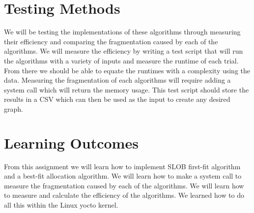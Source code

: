 \documentclass[letterpaper,10pt]{article}
\begin{document}
\section{Testing Methods}
We will be testing the implementations of these algorithms through measuring their efficiency and 
comparing the fragmentation caused by each of the algorithms. We will measure the efficiency by 
writing a test script that will run the algorithms with a variety of inputs and measure the runtime 
of each trial. From there we should be able to equate the runtimes with a complexity using the data.
 Measuring the fragmentation of each algorithms will require adding a system call which will return 
 the memory usage. This test script should store the results in a CSV which can then be used as the 
 input to create any desired graph.

\section{Learning Outcomes}
From this assignment we will learn how to implement SLOB first-fit algorithm and a best-fit 
allocation algorithm. We will learn how to make a system call to measure the fragmentation caused by each of the algorithms. We will learn how to measure and calculate the efficiency of the 
algorithms. We learned how to do all this within the Linux yocto kernel.
\end{document}
